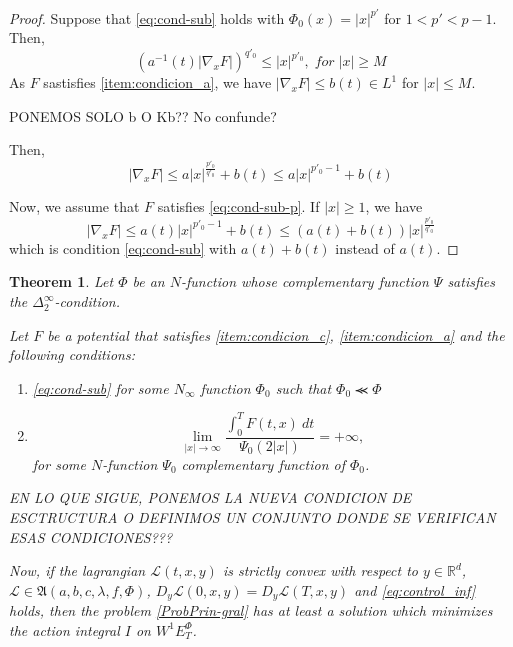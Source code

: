 \documentclass[twoside]{article}
\newtheorem{thm}{Theorem}[section]
\theoremstyle{remark}
\newcommand{\ephi}{E^{\Phi}}
\newcommand{\wphie}{W^{1}\ephi}
\newcommand{\rr}{\mathbb{R}}
\renewcommand{\leq}{\leqslant}
\renewcommand{\geq}{\geqslant}
\begin{document}
\begin{proof}
Suppose that \eqref{eq:cond-sub} holds with $\Phi_0(x)=|x|^{p'}$ for $1<p'<p-1$. Then, 
\[
(a^{-1}(t)|\nabla_x F|)^{q'_0}\leq |x|^{p'_0},\;for\; |x|\geq M
\]
As $F$ sastisfies \ref{item:condicion_a}, we have
$|\nabla_x F|\leq b(t)\in L^1$ for $|x|\leq M$. 

PONEMOS SOLO b O Kb?? No confunde?

Then, 
\[
|\nabla_x F|\leq a |x|^{\frac{p'_0}{q'_0}}+b(t)\leq a|x|^{p'_0-1}+b(t)
\]

Now, we assume that $F$ satisfies \eqref{eq:cond-sub-p}. If $|x|\geq 1$, we have 
\[
|\nabla_x F|\leq a(t)|x|^{p'_0-1}+b(t)\leq (a(t)+b(t))|x|^{\frac{p'_0}{q'_0}}
\]
which is condition \eqref{eq:cond-sub} with $a(t)+b(t)$ instead of $a(t)$.
\end{proof}


\begin{thm}\label{coercitividad-r}
Let $\Phi$ be an $N$-function whose complementary function $\Psi$ satisfies the $\Delta_2^{\infty}$-condition.

Let $F$ be a potential that satisfies \ref{item:condicion_c}, \ref{item:condicion_a} and the following conditions:
\begin{enumerate}
\item \eqref{eq:cond-sub} for some $N_{\infty}$ function $\Phi_0$ such that $\Phi_0\llcurly \Phi$
\item 
\begin{equation}\label{eq:propiedad-coercividad-phi0}
\lim_{|x|\to\infty}\frac{\int_{0}^{T}F(t,x)\ dt}{\Psi_0(2|x|)}=+\infty,
\end{equation}
for some $N$-function $\Psi_0$ complementary function of $\Phi_0$.
\end{enumerate}

EN LO QUE SIGUE, PONEMOS LA NUEVA CONDICION DE ESCTRUCTURA O DEFINIMOS UN CONJUNTO DONDE SE VERIFICAN 
ESAS CONDICIONES???

Now,  if the lagrangian $\mathcal{L}(t,x,y)$ is strictly convex  with respect to $y\in\rr^d$,
$\mathcal{L}\in \mathfrak{A}(a,b,c,\lambda,f,\Phi)$,
$D_y\mathcal{L}(0,x,y)=D_y\mathcal{L}(T,x,y)$
and \eqref{eq:control_inf} holds,
then the problem \eqref{ProbPrin-gral} has at least a solution which minimizes the action integral $I$ on $\wphie_T$.
\end{thm}
\end{document}
